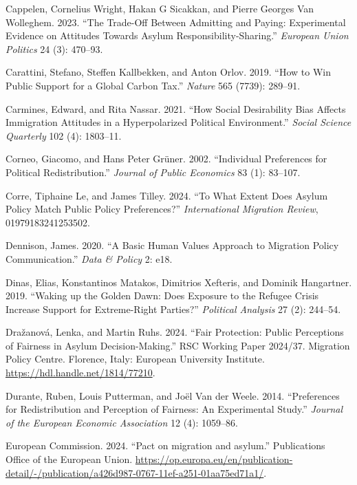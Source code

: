 \documentclass[
  12pt,
  a4paper,
]{article}
\newlength{\cslhangindent}
\newenvironment{CSLReferences}[2] %
 {\begin{list}{}{%
  \setlength{\itemindent}{0pt}
  \setlength{\leftmargin}{0pt}
  \setlength{\parsep}{0pt}
  \ifodd #1
   \setlength{\leftmargin}{\cslhangindent}
   \setlength{\itemindent}{-1\cslhangindent}
  \fi
  \setlength{\itemsep}{#2\baselineskip}}}
 {\end{list}}
\begin{document}
\begin{CSLReferences}{1}{0}
Cappelen, Cornelius Wright, Hakan G Sicakkan, and Pierre Georges Van Wolleghem. 2023. {``The Trade-Off Between Admitting and Paying: Experimental Evidence on Attitudes Towards Asylum Responsibility-Sharing.''} \emph{European Union Politics} 24 (3): 470--93.

Carattini, Stefano, Steffen Kallbekken, and Anton Orlov. 2019. {``How to Win Public Support for a Global Carbon Tax.''} \emph{Nature} 565 (7739): 289--91.

Carmines, Edward, and Rita Nassar. 2021. {``How Social Desirability Bias Affects Immigration Attitudes in a Hyperpolarized Political Environment.''} \emph{Social Science Quarterly} 102 (4): 1803--11.

Corneo, Giacomo, and Hans Peter Grüner. 2002. {``Individual Preferences for Political Redistribution.''} \emph{Journal of Public Economics} 83 (1): 83--107.

Corre, Tiphaine Le, and James Tilley. 2024. {``To What Extent Does Asylum Policy Match Public Policy Preferences?''} \emph{International Migration Review}, 01979183241253502.

Dennison, James. 2020. {``A Basic Human Values Approach to Migration Policy Communication.''} \emph{Data \& Policy} 2: e18.

Dinas, Elias, Konstantinos Matakos, Dimitrios Xefteris, and Dominik Hangartner. 2019. {``Waking up the Golden Dawn: Does Exposure to the Refugee Crisis Increase Support for Extreme-Right Parties?''} \emph{Political Analysis} 27 (2): 244--54.

Dražanová, Lenka, and Martin Ruhs. 2024. {``Fair Protection: Public Perceptions of Fairness in Asylum Decision-Making.''} RSC Working Paper 2024/37. Migration Policy Centre. Florence, Italy: European University Institute. \url{https://hdl.handle.net/1814/77210}.

Durante, Ruben, Louis Putterman, and Joël Van der Weele. 2014. {``Preferences for Redistribution and Perception of Fairness: An Experimental Study.''} \emph{Journal of the European Economic Association} 12 (4): 1059--86.

European Commission. 2024. {``{Pact on migration and asylum}.''} Publications Office of the European Union. \url{https://op.europa.eu/en/publication-detail/-/publication/a426d987-0767-11ef-a251-01aa75ed71a1/}.


\end{CSLReferences}
\end{document}
